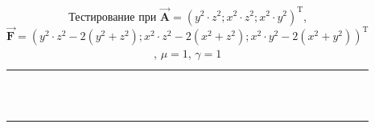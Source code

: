 \begin{table}
	\caption{Тестирование при $\overrightarrow{\textbf{A}} = (y^2 \cdot z^2; x^2 \cdot z^2; x^2 \cdot y^2)^{\text{T}}$, $\overrightarrow{\textbf{F}} = (y^2 \cdot z^2 - 2(y^2 + z^2); x^2 \cdot z^2 - 2(x^2 + z^2); x^2 \cdot y^2 - 2(x^2 + y^2))^{\text{T}}$, $\mu = 1$, $\gamma = 1$}
	\centering
	\small
	\begin{tabularx}{1.0\textwidth}{| >{\raggedright\arraybackslash}X | >{\raggedright\arraybackslash}X | >{\raggedright\arraybackslash}X |>{\raggedright\arraybackslash}X |}
		\hline
		\centering{Ребро} & \centering{Значение} & \centering{Абсолютная погрешность} & \centering{Относительная погрешность} \tabularnewline \hline
		
		
		\centering{($x; 1.0; 1.0$)} & \centering{1.00000000E+000}& \centering{0.00000000E+000} & \centering{0.00000000E+000} \tabularnewline \hline
		
		\centering{($x; 2.0; 1.0$)} & \centering{4.00000000E+000}& \centering{0.00000000E+000} & \centering{0.00000000E+000} \tabularnewline \hline
		
		\centering{($x; 1.0; 2.0$)} & \centering{4.00000000E+000}& \centering{0.00000000E+000} & \centering{0.00000000E+000} \tabularnewline \hline
		
		\centering{($x; 2.0; 2.0$)} & \centering{1.60000000E+001}& \centering{0.00000000E+000} & \centering{0.00000000E+000} \tabularnewline \hline
		
		
		
		\centering{($1.0; y; 1.0$)} & \centering{1.00000000E+000}& \centering{0.00000000E+000} & \centering{0.00000000E+000} \tabularnewline \hline
		
		\centering{($2.0; y; 1.0$)} & \centering{4.00000000E+000}& \centering{0.00000000E+000} & \centering{0.00000000E+000} \tabularnewline \hline
		
		\centering{($1.0; y; 2.0$)} & \centering{4.00000000E+000}& \centering{0.00000000E+000} & \centering{0.00000000E+000} \tabularnewline \hline
		
		\centering{($2.0; y; 2.0$)} & \centering{1.60000000E+001}& \centering{0.00000000E+000} & \centering{0.00000000E+000} \tabularnewline \hline
		
		
		
		\centering{($1.0; 1.0; z$)} & \centering{1.00000000E+000}& \centering{0.00000000E+000} & \centering{0.00000000E+000} \tabularnewline \hline
		
		\centering{($2.0; 1.0; z$)} & \centering{4.00000000E+000}& \centering{0.00000000E+000} & \centering{0.00000000E+000} \tabularnewline \hline
		
		\centering{($1.0; 2.0; z$)} & \centering{4.00000000E+000}& \centering{0.00000000E+000} & \centering{0.00000000E+000} \tabularnewline \hline
		
		\centering{($2.0; 2.0; z$)} & \centering{1.60000000E+001}& \centering{0.00000000E+000} & \centering{0.00000000E+000} \tabularnewline \hline
		
	\end{tabularx}
	\label{tab:test9}
\end{table}

